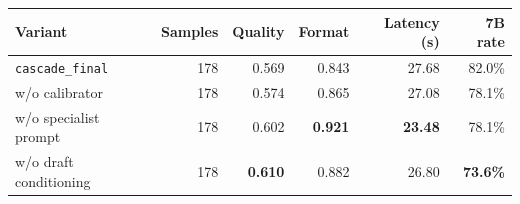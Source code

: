 \begin{tabular}{lrrrrr}
\toprule
Variant & Samples & Quality & Format & Latency (s) & 7B rate \\
\midrule
\rowcolor{paceTealLight}
\texttt{cascade\_final} & 178 & 0.569 & 0.843 & 27.68 & 82.0\% \\
w/o calibrator & 178 & 0.574 & 0.865 & 27.08 & 78.1\% \\
w/o specialist prompt & 178 & 0.602 & \textbf{0.921} & \textbf{23.48} & 78.1\% \\
w/o draft conditioning & 178 & \textbf{0.610} & 0.882 & 26.80 & \textbf{73.6\%} \\
\bottomrule
\end{tabular}
